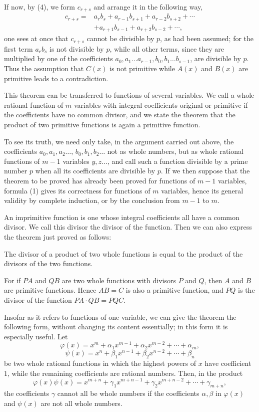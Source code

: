 \documentclass[11pt]{article}
\begin{document}
If now, by (4), we form $c_{r+s}$ and arrange it in the following way,
\begin{equation}
\begin{aligned}
 c_{r+s}={}&a_rb_s+a_{r-1}b_{s+1}+a_{r-2}b_{s+2}+\cdots\\
&+a_{r+1}b_{s-1}+a_{r+2}b_{s-2}+\cdots,
\end{aligned}
\tag{1}
\end{equation}
one sees at once that $c_{r+s}$ cannot be divisible by $p$, as had been assumed; for the first term $a_rb_s$ is not divisible by $p$, while all other terms, since they are multiplied by one of the coefficients $a_0,a_1\ldots a_{r-1},b_0,b_1\ldots b_{s-1}$, are divisible by $p$. Thus the assumption that $C(x)$ is not primitive while $A(x)$ and $B(x)$ are primitive leads to a contradiction.

This theorem can be transferred to functions of several variables. We call a whole rational function of $m$ variables with integral coefficients original or primitive if the coefficients have no common divisor, and we state the theorem that the product of two primitive functions is again a primitive function.

To see its truth, we need only take, in the argument carried out above, the coefficients $a_0,a_1,a_2\ldots$, $b_0,b_1,b_2\ldots$ not as whole numbers, but as whole rational functions of $m-1$ variables $y,z\ldots$, and call such a function divisible by a prime number $p$ when all its coefficients are divisible by $p$. If we then suppose that the theorem to be proved has already been proved for functions of $m-1$ variables, formula (1) gives its correctness for functions of $m$ variables, hence its general validity by complete induction, or by the conclusion from $m-1$ to $m$.

An imprimitive function is one whose integral coefficients all have a common divisor. We call this divisor the divisor of the function. Then we can also express the theorem just proved as follows:

The divisor of a product of two whole functions is equal to the product of the divisors of the two functions.

For if $PA$ and $QB$ are two whole functions with divisors $P$ and $Q$, then $A$ and $B$ are primitive functions. Hence $AB=C$ is also a primitive function, and $PQ$ is the divisor of the function $PA\cdot QB=PQC$.

Insofar as it refers to functions of one variable, we can give the theorem the following form, without changing its content essentially; in this form it is especially useful. Let
\[
 \varphi(x)=x^m+\alpha_1x^{m-1}+\alpha_2x^{m-2}+\cdots+\alpha_m,
\]
\[
 \psi(x)=x^n+\beta_1x^{n-1}+\beta_2x^{n-2}+\cdots+\beta_n
\]
be two whole rational functions in which the highest powers of $x$ have coefficient $1$, while the remaining coefficients are rational numbers. Then, in the product
\[
 \varphi(x)\psi(x)=x^{m+n}+\gamma_1x^{m+n-1}+\gamma_2x^{m+n-2}+\cdots+\gamma_{m+n},
\]
the coefficients $\gamma$ cannot all be whole numbers if the coefficients $\alpha,\beta$ in $\varphi(x)$ and $\psi(x)$ are not all whole numbers.
\end{document}
